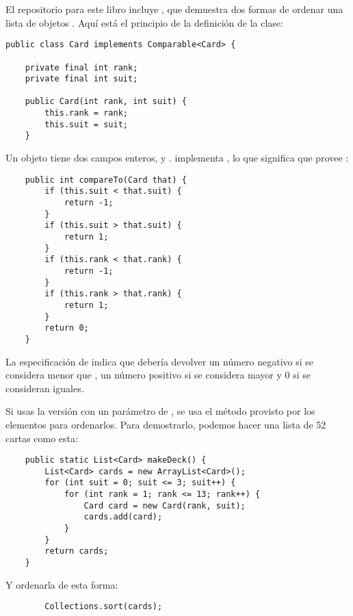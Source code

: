 \documentclass[12pt]{book}
\theoremstyle{exercise}
\begin{document}

El repositorio para este libro incluye , que demuestra
dos formas de ordenar una lista de objetos . Aquí está el
principio de la definición de la clase:

\begin{verbatim}
public class Card implements Comparable<Card> {

    private final int rank;
    private final int suit;

    public Card(int rank, int suit) {
        this.rank = rank;
        this.suit = suit;
    }
\end{verbatim}

Un objeto  tiene dos campos enteros,  y
.  implementa
, lo que significa que
provee :

\begin{verbatim}
    public int compareTo(Card that) {
        if (this.suit < that.suit) {
            return -1;
        }
        if (this.suit > that.suit) {
            return 1;
        }
        if (this.rank < that.rank) {
            return -1;
        }
        if (this.rank > that.rank) {
            return 1;
        }
        return 0;
    }
\end{verbatim}


La especificación de  indica que debería devolver
un número negativo si  se considera menor que
, un número positivo si se considera mayor y 0 si
se consideran iguales.

Si usas la versión con un parámetro de , se
usa el método  provisto por los elementos para ordenarlos.
Para demostrarlo, podemos hacer una lista de 52 cartas como esta:

\begin{verbatim}
    public static List<Card> makeDeck() {
        List<Card> cards = new ArrayList<Card>();
        for (int suit = 0; suit <= 3; suit++) {
            for (int rank = 1; rank <= 13; rank++) {
                Card card = new Card(rank, suit);
                cards.add(card);
            }
        }
        return cards;
    }
\end{verbatim}

Y ordenarla de esta forma:

\begin{verbatim}
        Collections.sort(cards);
\end{verbatim}
\end{document}
